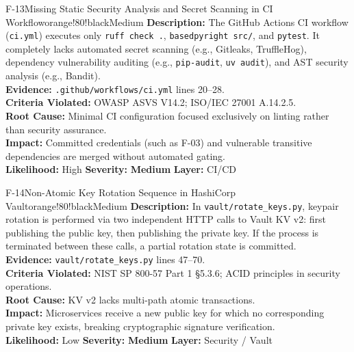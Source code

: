 \documentclass[10pt,a4paper]{report}
\begin{document}
\begin{findingbox}{F-13}{Missing Static Security Analysis and Secret Scanning in CI Workflow}{orange!80!black}{Medium}
\textbf{Description:} The GitHub Actions CI workflow (\texttt{ci.yml}) executes only \texttt{ruff check .}, \texttt{basedpyright src/}, and \texttt{pytest}. It completely lacks automated secret scanning (e.g., Gitleaks, TruffleHog), dependency vulnerability auditing (e.g., \texttt{pip-audit}, \texttt{uv audit}), and AST security analysis (e.g., Bandit).\\
\textbf{Evidence:} \texttt{.github/workflows/ci.yml} lines 20--28.\\
\textbf{Criteria Violated:} OWASP ASVS V14.2; ISO/IEC 27001 A.14.2.5.\\
\textbf{Root Cause:} Minimal CI configuration focused exclusively on linting rather than security assurance.\\
\textbf{Impact:} Committed credentials (such as F-03) and vulnerable transitive dependencies are merged without automated gating.\\
\textbf{Likelihood:} High \quad \textbar \quad \textbf{Severity:} \textbf{Medium} \quad \textbar \quad \textbf{Layer:} CI/CD
\end{findingbox}

\begin{findingbox}{F-14}{Non-Atomic Key Rotation Sequence in HashiCorp Vault}{orange!80!black}{Medium}
\textbf{Description:} In \texttt{vault/rotate\_keys.py}, keypair rotation is performed via two independent HTTP calls to Vault KV v2: first publishing the public key, then publishing the private key. If the process is terminated between these calls, a partial rotation state is committed.\\
\textbf{Evidence:} \texttt{vault/rotate\_keys.py} lines 47--70.\\
\textbf{Criteria Violated:} NIST SP 800-57 Part 1 §5.3.6; ACID principles in security operations.\\
\textbf{Root Cause:} KV v2 lacks multi-path atomic transactions.\\
\textbf{Impact:} Microservices receive a new public key for which no corresponding private key exists, breaking cryptographic signature verification.\\
\textbf{Likelihood:} Low \quad \textbar \quad \textbf{Severity:} \textbf{Medium} \quad \textbar \quad \textbf{Layer:} Security / Vault
\end{findingbox}
\end{document}
